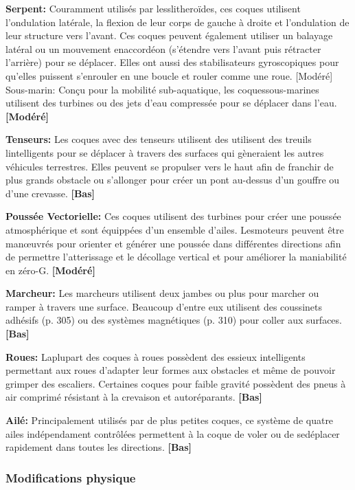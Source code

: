 \textbf{Serpent:} Couramment utilisés par lesslitheroïdes, ces coques utilisent l'ondulation latérale, la flexion de leur corps de gauche à droite et l'ondulation de leur structure vers l'avant. Ces coques peuvent également utiliser un balayage latéral ou un mouvement enaccordéon (s'étendre vers l'avant puis rétracter l'arrière) pour se déplacer. Elles ont aussi des stabilisateurs gyroscopiques pour qu'elles puissent s'enrouler en une boucle et rouler comme une roue. [Modéré] Sous-marin: Conçu pour la mobilité sub-aquatique, les coquessous-marines utilisent des turbines ou des jets d'eau compressée pour se déplacer dans l'eau. \textbf{[Modéré]} 

\textbf{Tenseurs:} Les coques avec des tenseurs utilisent des utilisent des treuils lintelligents pour se déplacer à travers des surfaces qui gèneraient les autres véhicules terrestres. Elles peuvent se propulser vers le haut afin de franchir de plus grands obstacle ou s'allonger pour créer un pont au-dessus d'un gouffre ou d'une crevasse. \textbf{[Bas]} 

\textbf{Poussée Vectorielle:} Ces coques utilisent des turbines pour créer une poussée atmosphérique et sont équippées d'un ensemble d'ailes. Lesmoteurs peuvent être manœuvrés pour orienter et générer une poussée dans différentes directions afin de permettre l'atterissage et le décollage vertical et pour améliorer la maniabilité en zéro-G. \textbf{[Modéré]} 

\textbf{Marcheur:} Les marcheurs utilisent deux jambes ou plus pour marcher ou ramper à travers une surface. Beaucoup d'entre eux utilisent des coussinets adhésifs (p. 305) ou des systèmes magnétiques (p. 310) pour coller aux surfaces. \textbf{[Bas]} 

\textbf{Roues:} Laplupart des coques à roues possèdent des essieux intelligents permettant aux roues d'adapter leur formes aux obstacles et même de pouvoir grimper des escaliers. Certaines coques pour faible gravité possèdent des pneus à air comprimé résistant à la crevaison et autoréparants. \textbf{[Bas]} 

\textbf{Ailé:} Principalement utilisés par de plus petites coques, ce système de quatre ailes indépendament contrôlées permettent à la coque de voler ou de sedéplacer rapidement dans toutes les directions. \textbf{[Bas]} 

\subsubsection{Modifications physique} 

